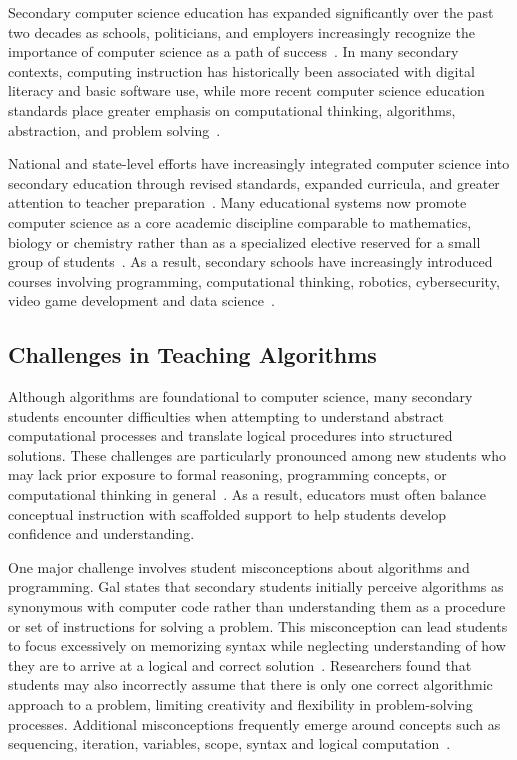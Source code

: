 Secondary computer science education has expanded significantly over the past two decades as schools, politicians, and employers increasingly
  recognize the importance of computer science as a path of success~\cite{grover2017assessing,csta2017}.
In many secondary contexts, computing instruction has historically been associated with digital literacy and basic software use, while more recent computer science education standards place greater emphasis on computational thinking, algorithms, abstraction, and problem solving~\cite{grover2017assessing,csta2017}.


National and state-level efforts have increasingly integrated computer science into secondary education through revised standards, expanded curricula, and greater attention to teacher preparation~\cite{yadav2016computational,csta2017}.
Many educational systems now promote computer science as a core academic discipline comparable to mathematics, biology or chemistry rather than as a
  specialized elective reserved for a small group of students~\cite{csta2017}.
As a result, secondary schools have increasingly introduced courses involving programming, computational thinking, robotics, cybersecurity, video
  game development and data science~\cite{yadav2016computational}.

\subsection{Challenges in Teaching Algorithms}

Although algorithms are foundational to computer science, many secondary students encounter difficulties when attempting to understand abstract computational
  processes and translate logical procedures into structured solutions.
These challenges are particularly pronounced among new students who may lack prior exposure to formal reasoning, programming concepts, or
  computational thinking in general~\cite{nijenhuis2023teaching}.
As a result, educators must often balance conceptual instruction with scaffolded support to help students develop confidence and understanding.

One major challenge involves student misconceptions about algorithms and programming.
Gal states that secondary students initially perceive algorithms as synonymous with computer code rather than understanding them as a procedure or set of
  instructions for solving a problem.
This misconception can lead students to focus excessively on memorizing syntax while neglecting understanding of how they are to arrive at a logical
  and correct solution~\cite{gal2004efficiency}.
Researchers found that students may also incorrectly assume that there is only one correct algorithmic approach to a problem, limiting creativity and flexibility in
  problem-solving processes.
Additional misconceptions frequently emerge around concepts such as sequencing, iteration, variables, scope, syntax and logical
  computation~\cite{futschek2006algorithmic,grover2017assessing}.

